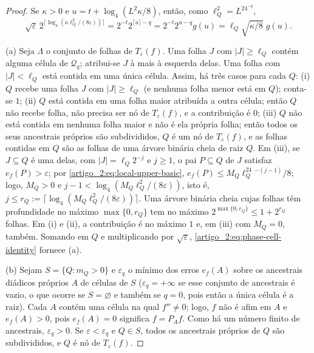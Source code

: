 \documentclass[12pt,a4paper]{article}
\theoremstyle{preciso}
\theoremstyle{definition}
\theoremstyle{preciso}
\theoremstyle{preciso}
\theoremstyle{preciso}
\theoremstyle{preciso}
\theoremstyle{definition}
\theoremstyle{preciso}
\theoremstyle{definition}
\theoremstyle{preciso}
\theoremstyle{preciso}
\theoremstyle{definition}
\begin{document}
\begin{proof}
Se $\kappa>0$ e $u=t+\log_4(L^2\kappa/8)$, então, como $\ell_Q^2=L^24^{-q}$,
\begin{equation}
 \sqrt\varepsilon\,2^{\lceil\log_4(\kappa\ell_Q^2/(8\varepsilon))\rceil}
 =2^{-t}2^{\lceil u\rceil-q}=2^{-t}2^{u-q}g(u)=\ell_Q\sqrt{\kappa/8}\;g(u).
 \label{artigo_2:eq:phase-cell-identity}
\end{equation}

(a) Seja $\Lambda$ o conjunto de folhas de $T_\varepsilon(f)$. Uma folha
$J$ com $|J|\ge\ell_Q$ contém alguma célula de $\mathcal Q_q$; atribui-se $J$
à mais à esquerda delas. Uma folha com $|J|<\ell_Q$ está contida em uma única
célula. Assim, há três casos para cada $Q$: (i) $Q$ recebe uma folha $J$ com
$|J|\ge\ell_Q$ (e nenhuma folha menor está em $Q$); conta-se $1$; (ii) $Q$ está
contida em uma folha maior atribuída a outra célula; então $Q$ não recebe folha,
não precisa ser nó de $T_\varepsilon(f)$, e a contribuição é $0$; (iii) $Q$ não
está contida em nenhuma folha maior e não é ela própria folha; então
todos os seus ancestrais próprios são subdivididos, $Q$ é um nó de
$T_\varepsilon(f)$, e as folhas contidas em $Q$ são as folhas
de uma árvore binária cheia de raiz $Q$. Em (iii), se $J\subseteq Q$ é uma delas, com
$|J|=\ell_Q2^{-j}$ e $j\ge1$, o pai $P\subseteq Q$ de $J$ satisfaz
$e_f(P)>\varepsilon$; por \eqref{artigo_2:eq:local-upper-basic},
$e_f(P)\le M_Q\ell_Q^24^{-(j-1)}/8$; logo, $M_Q>0$ e
$j-1<\log_4(M_Q\ell_Q^2/(8\varepsilon))$, isto é,
$j\le r_Q:=\lceil\log_4(M_Q\ell_Q^2/(8\varepsilon))\rceil$. Uma árvore binária cheia
cujas folhas têm profundidade no máximo $\max\{0,r_Q\}$ tem no máximo
$2^{\max\{0,r_Q\}}\le1+2^{r_Q}$ folhas. Em (i) e (ii), a contribuição é no máximo
$1$ e, em (iii) com $M_Q=0$, também. Somando em $Q$
e multiplicando por $\sqrt\varepsilon$,
\eqref{artigo_2:eq:phase-cell-identity} fornece (a).

(b) Sejam $S=\{Q:m_Q>0\}$ e $\varepsilon_q$ o mínimo dos erros $e_f(A)$ sobre
os ancestrais diádicos próprios $A$ de células de $S$ ($\varepsilon_q=+\infty$ se
esse conjunto de ancestrais é vazio, o que ocorre se $S=\varnothing$ e também se
$q=0$, pois então a única célula é a raiz). Cada $A$ contém uma célula na qual $f''\ne0$; logo, $f$ não é afim em $A$
e $e_f(A)>0$, pois $e_f(A)=0$ significa $f=P_Af$. Como há um número finito de
ancestrais, $\varepsilon_q>0$. Se $\varepsilon<\varepsilon_q$ e $Q\in S$, todos os
ancestrais próprios de $Q$ são subdivididos, e $Q$ é nó de $T_\varepsilon(f)$.


\end{proof}
\end{document}
